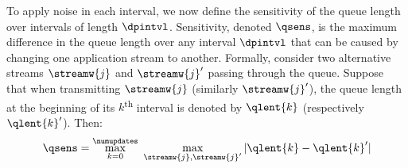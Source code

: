 To apply noise in each interval, we now define the sensitivity of
the queue length over intervals of length $\dpintvl$.
Sensitivity, denoted $\qsens$, is the maximum difference in the queue length
over any interval $\dpintvl$ that can be caused by changing one application
stream to another.
Formally, consider two alternative streams $\streamw{j}$ and
$\streamw{j}'$ passing through the queue.
Suppose that when transmitting $\streamw{j}$ (similarly $\streamw{j}'$), the
queue length at the beginning of its $k$\textsuperscript{th}
interval is denoted by $\qlent{k}$ (respectively $\qlent{k}'$).
Then:
\setlength{\abovedisplayskip}{0pt}
\begin{equation}
    \qsens = \max_{k = 0}^{\numupdates}~\max_{\streamw{j},
        \streamw{j}'} | \qlent{k} - \qlent{k}' |
    \label{eqn:ssens}
\end{equation}
%

